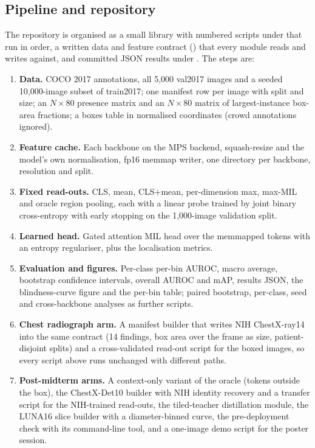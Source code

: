 \documentclass[10pt,letterpaper,twocolumn]{article}
\newcommand{\fname}[1]{\texttt{\detokenize{#1}}}
\begin{document}
\subsection{Pipeline and repository}
The repository is organised as a small library \fname{src/lip/} with numbered scripts under \fname{scripts/} that run in order, a
written data and feature contract (\fname{docs/CONTRACTS.md}) that every module reads and
writes against, and committed JSON results under \fname{results/}. The steps are:
\begin{enumerate}
\item \textbf{Data.} COCO 2017 annotations, all 5,000 val2017 images and a seeded
  10,000-image subset of train2017; one manifest row per image with split and size; an
  $N\times80$ presence matrix and an $N\times80$ matrix of largest-instance box-area fractions;
  a boxes table in normalised coordinates (crowd annotations ignored).
\item \textbf{Feature cache.} Each backbone on the MPS backend, squash-resize and the model's
  own normalisation, fp16 memmap writer, one directory per backbone, resolution and split.
\item \textbf{Fixed read-outs.} CLS, mean, CLS+mean, per-dimension max, max-MIL and oracle
  region pooling, each with a linear probe trained by joint binary cross-entropy with early
  stopping on the 1,000-image validation split.
\item \textbf{Learned head.} Gated attention MIL head over the memmapped tokens with an
  entropy regulariser, plus the localisation metrics.
\item \textbf{Evaluation and figures.} Per-class per-bin AUROC, macro average, bootstrap
  confidence intervals, overall AUROC and mAP, results JSON, the blindness-curve figure and
  the per-bin table; paired bootstrap, per-class, seed and cross-backbone analyses as further
  scripts.
\item \textbf{Chest radiograph arm.} A manifest builder that writes NIH ChestX-ray14 into the
  same contract (14 findings, box area over the frame as size, patient-disjoint splits) and a
  cross-validated read-out script for the boxed images, so every script above runs unchanged
  with different paths.
\item \textbf{Post-midterm arms.} A context-only variant of the oracle (tokens outside the
  box), the ChestX-Det10 builder with NIH identity recovery and a transfer script for the
  NIH-trained read-outs, the tiled-teacher distillation module, the LUNA16 slice builder with
  a diameter-binned curve, the pre-deployment check with its command-line tool, and a
  one-image demo script for the poster session.
\end{enumerate}
\end{document}
